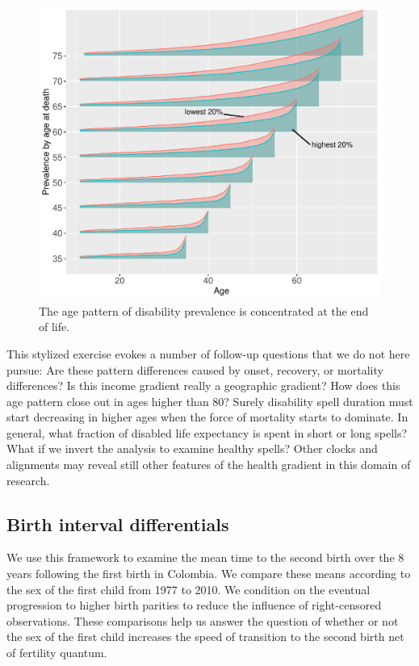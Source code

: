 \documentclass{article}
\begin{document}
\begin{figure}
    \centering
    \includegraphics[scale=.6]{Figures/App1_macro3.pdf}
    \caption{The age pattern of disability prevalence is concentrated at the end of life. }
    \label{fig:a1m3}
\end{figure}

This stylized exercise evokes a number of follow-up questions that we do not here pursue: Are these pattern differences caused by onset, recovery, or mortality differences? Is this income gradient really a geographic gradient? How does this age pattern close out in ages higher than 80? Surely disability spell duration must start decreasing in higher ages when the force of mortality starts to dominate. In general, what fraction of disabled life expectancy is spent in short or long spells? What if we invert the analysis to examine healthy spells? Other clocks and alignments may reveal still other features of the health gradient in this domain of research.

\FloatBarrier
\subsection{Birth interval differentials}

 We use this framework to examine the mean time to the second birth over the 8 years following the first birth in Colombia. We compare these means according to the sex of the first child from 1977 to 2010. We condition on the eventual progression to higher birth parities  to reduce the influence of right-censored observations. These comparisons help us answer the question of whether or not the sex of the first child increases the speed of transition to the second birth net of fertility quantum.
 
\end{document}
